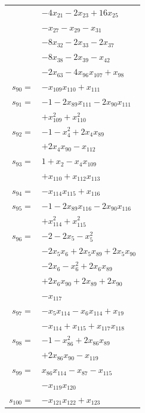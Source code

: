 \begin{longtable}{@{}r@{\;}l@{}}
 & \(\displaystyle -4x_{21} -2x_{23} +16x_{25}\) \\
 & \(\displaystyle -x_{27} -x_{29} -x_{31}\) \\
 & \(\displaystyle -8x_{32} -2x_{33} -2x_{37}\) \\
 & \(\displaystyle -8x_{38} -2x_{39} -x_{42}\) \\
 & \(\displaystyle -2x_{63} -4x_{96}x_{107} +x_{98}\) \\[3pt]
\(s_{90}=\) & \(\displaystyle -x_{109}x_{110} +x_{111}\) \\[3pt]
\(s_{91}=\) & \(\displaystyle -1 -2x_{89}x_{111} -2x_{90}x_{111}\) \\
 & \(\displaystyle +x_{109}^{2} +x_{110}^{2}\) \\[3pt]
\(s_{92}=\) & \(\displaystyle -1 -x_{4}^{2} +2x_{4}x_{89}\) \\
 & \(\displaystyle +2x_{4}x_{90} -x_{112}\) \\[3pt]
\(s_{93}=\) & \(\displaystyle 1 +x_{2} -x_{4}x_{109}\) \\
 & \(\displaystyle +x_{110} +x_{112}x_{113}\) \\[3pt]
\(s_{94}=\) & \(\displaystyle -x_{114}x_{115} +x_{116}\) \\[3pt]
\(s_{95}=\) & \(\displaystyle -1 -2x_{89}x_{116} -2x_{90}x_{116}\) \\
 & \(\displaystyle +x_{114}^{2} +x_{115}^{2}\) \\[3pt]
\(s_{96}=\) & \(\displaystyle -2 -2x_{5} -x_{5}^{2}\) \\
 & \(\displaystyle -2x_{5}x_{6} +2x_{5}x_{89} +2x_{5}x_{90}\) \\
 & \(\displaystyle -2x_{6} -x_{6}^{2} +2x_{6}x_{89}\) \\
 & \(\displaystyle +2x_{6}x_{90} +2x_{89} +2x_{90}\) \\
 & \(\displaystyle -x_{117}\) \\[3pt]
\(s_{97}=\) & \(\displaystyle -x_{5}x_{114} -x_{6}x_{114} +x_{19}\) \\
 & \(\displaystyle -x_{114} +x_{115} +x_{117}x_{118}\) \\[3pt]
\(s_{98}=\) & \(\displaystyle -1 -x_{86}^{2} +2x_{86}x_{89}\) \\
 & \(\displaystyle +2x_{86}x_{90} -x_{119}\) \\[3pt]
\(s_{99}=\) & \(\displaystyle x_{86}x_{114} -x_{87} -x_{115}\) \\
 & \(\displaystyle -x_{119}x_{120}\) \\[3pt]
\(s_{100}=\) & \(\displaystyle -x_{121}x_{122} +x_{123}\) \\[3pt]

\end{longtable}

